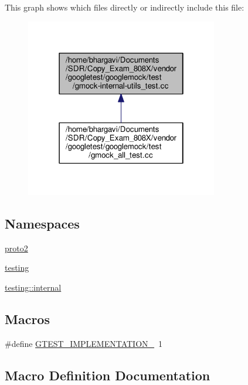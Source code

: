 This graph shows which files directly or indirectly include this file\+:
\nopagebreak
\begin{figure}[H]
\begin{center}
\leavevmode
\includegraphics[width=238pt]{gmock-internal-utils__test_8cc__dep__incl}
\end{center}
\end{figure}
\subsection*{Namespaces}
\begin{DoxyCompactItemize}
\item 
 \hyperlink{namespaceproto2}{proto2}
\item 
 \hyperlink{namespacetesting}{testing}
\item 
 \hyperlink{namespacetesting_1_1internal}{testing\+::internal}
\end{DoxyCompactItemize}
\subsection*{Macros}
\begin{DoxyCompactItemize}
\item 
\#define \hyperlink{gmock-internal-utils__test_8cc_a83bd232fd1077579fada92c31bb7469f}{G\+T\+E\+S\+T\+\_\+\+I\+M\+P\+L\+E\+M\+E\+N\+T\+A\+T\+I\+O\+N\+\_\+}~1
\end{DoxyCompactItemize}


\subsection{Macro Definition Documentation}
